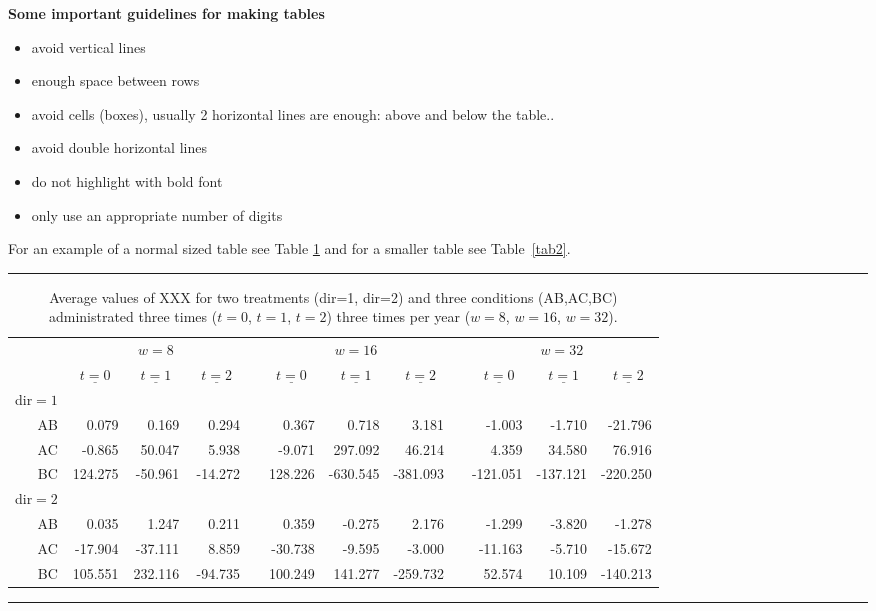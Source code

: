 \documentclass[a4paper,fleqn]{cas-sc} %
\begin{document}
\medskip\noindent
\textbf{Some important guidelines for making tables}
\begin{itemize}
\item avoid vertical lines
\item enough space between rows
\item avoid cells (boxes), usually 2 horizontal lines are
enough: above and below the table.. 
\item avoid double horizontal lines
\item do not highlight with bold font
\item only use an appropriate number of digits


\end{itemize}
For an example of a normal sized table see Table \ref{tab1} and for a smaller table see Table~\ref{tab2}.
\begin{table}[h]%
\caption{Average values of XXX for two treatments (dir=1, dir=2) and three conditions (AB,AC,BC) administrated three times ($t=0$, $t=1$, $t=2$) three times per year ($w=8$, $w=16$, $w=32$).} 
\centering

\smallskip
\hrule
\begin{tabular}{@{}rrrrcrrrcrrr@{}}\label{tab1}
& \multicolumn{3}{c}{$w = 8$} & & \multicolumn{3}{c}{$w = 16$} &
 & \multicolumn{3}{c}{$w = 32$}\\
\cmidrule{2-4} \cmidrule{6-8} \cmidrule{10-12}
& $\underline{\phantom{x}t=0\phantom{x}}$& $\underline{\phantom{x}t=1\phantom{x}}$&$\underline{\phantom{x}t=2\phantom{x}}$&& $\underline{\phantom{x}t=0\phantom{x}}$ & $\underline{\phantom{x}t=1\phantom{x}}$ & $\underline{\phantom{x}t=2\phantom{x}}$ && $\underline{\phantom{x}t=0\phantom{x}}$ & $\underline{\phantom{x}t=1\phantom{x}}$ & $\underline{\phantom{x}t=2\phantom{x}}$\\
dir$=1$\\
AB & 0.079 & 0.169 & 0.294 && 0.367 & 0.718 & 3.181 && -1.003 & -1.710 & -21.796\\
AC & -0.865& 50.047& 5.938&& -9.071& 297.092& 46.214&& 4.359& 34.580& 76.916\\
BC & 124.275& -50.961& -14.272&& 128.226& -630.545& -381.093&& -121.051& -137.121& -220.250\\
dir$=2$\\
AB & 0.035& 1.247& 0.211&& 0.359& -0.275& 2.176&& -1.299& -3.820& -1.278\\
AC & -17.904& -37.111& 8.859&& -30.738& -9.595& -3.000&& -11.163& -5.710& -15.672\\
BC & 105.551& 232.116& -94.735&& 100.249& 141.277& -259.732&& 52.574& 10.109& -140.213\\
\end{tabular}

\smallskip
\hrule
\end{table}
\end{document}
